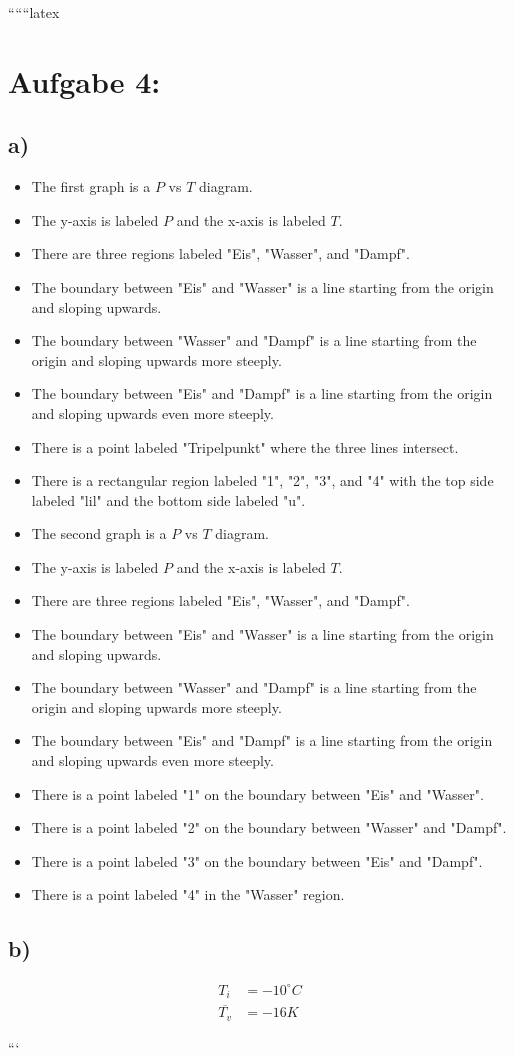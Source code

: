
``````latex


\section*{Aufgabe 4:}

\subsection*{a)}

\begin{itemize}
    \item The first graph is a $P$ vs $T$ diagram.
    \item The y-axis is labeled $P$ and the x-axis is labeled $T$.
    \item There are three regions labeled "Eis", "Wasser", and "Dampf".
    \item The boundary between "Eis" and "Wasser" is a line starting from the origin and sloping upwards.
    \item The boundary between "Wasser" and "Dampf" is a line starting from the origin and sloping upwards more steeply.
    \item The boundary between "Eis" and "Dampf" is a line starting from the origin and sloping upwards even more steeply.
    \item There is a point labeled "Tripelpunkt" where the three lines intersect.
    \item There is a rectangular region labeled "1", "2", "3", and "4" with the top side labeled "lil" and the bottom side labeled "u".
\end{itemize}

\begin{itemize}
    \item The second graph is a $P$ vs $T$ diagram.
    \item The y-axis is labeled $P$ and the x-axis is labeled $T$.
    \item There are three regions labeled "Eis", "Wasser", and "Dampf".
    \item The boundary between "Eis" and "Wasser" is a line starting from the origin and sloping upwards.
    \item The boundary between "Wasser" and "Dampf" is a line starting from the origin and sloping upwards more steeply.
    \item The boundary between "Eis" and "Dampf" is a line starting from the origin and sloping upwards even more steeply.
    \item There is a point labeled "1" on the boundary between "Eis" and "Wasser".
    \item There is a point labeled "2" on the boundary between "Wasser" and "Dampf".
    \item There is a point labeled "3" on the boundary between "Eis" and "Dampf".
    \item There is a point labeled "4" in the "Wasser" region.
\end{itemize}

\subsection*{b)}

\begin{align*}
    T_i &= -10^\circ C \\
    \overline{T_v} &= -16 K
\end{align*}

```